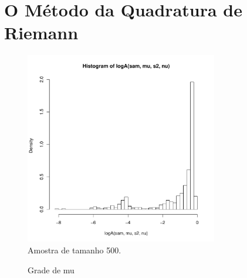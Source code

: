 \documentclass[12pt,reqno,a4paper,oneside]{report}
\begin{document}
\section*{\Large O Método da Quadratura de Riemann}

\begin{figure}[!htb]
	\centering
	\includegraphics[width=0.75\textwidth]{figuras/parte1/logA.pdf}
	\caption{Amostra de tamanho 500.}
	\label{fig:logA}
\end{figure}

\begin{figure}[!htb]
	\centering
	\caption{Grade de mu}
	\label{fig:grid_mu}
\end{figure}
\end{document}
